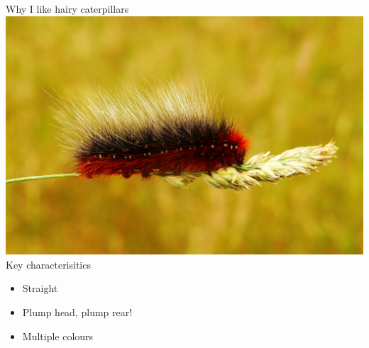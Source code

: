\documentclass[compress]{beamer}
\begin{document}
\begin{frame}[label=sec-8-3]{Why I like hairy caterpillars}
  \includegraphics[width=0.7\linewidth]{hairy_catapillar_1.jpg}\\
  Key characterisitics
  \begin{itemize}
    \item Straight
    \item Plump head, plump rear!
    \item Multiple colours
  \end{itemize}
\end{frame}
\end{document}

